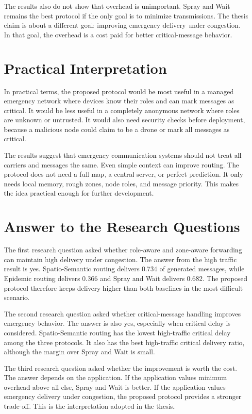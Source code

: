 The results also do not show that overhead is unimportant. Spray and Wait remains the best protocol if the only goal is to minimize transmissions. The thesis claim is about a different goal: improving emergency delivery under congestion. In that goal, the overhead is a cost paid for better critical-message behavior.

\section{Practical Interpretation}
In practical terms, the proposed protocol would be most useful in a managed emergency network where devices know their roles and can mark messages as critical. It would be less useful in a completely anonymous network where roles are unknown or untrusted. It would also need security checks before deployment, because a malicious node could claim to be a drone or mark all messages as critical.

The results suggest that emergency communication systems should not treat all carriers and messages the same. Even simple context can improve routing. The protocol does not need a full map, a central server, or perfect prediction. It only needs local memory, rough zones, node roles, and message priority. This makes the idea practical enough for further development.

\section{Answer to the Research Questions}
The first research question asked whether role-aware and zone-aware forwarding can maintain high delivery under congestion. The answer from the high traffic result is yes. Spatio-Semantic routing delivers 0.734 of generated messages, while Epidemic routing delivers 0.366 and Spray and Wait delivers 0.682. The proposed protocol therefore keeps delivery higher than both baselines in the most difficult scenario.

The second research question asked whether critical-message handling improves emergency behavior. The answer is also yes, especially when critical delay is considered. Spatio-Semantic routing has the lowest high-traffic critical delay among the three protocols. It also has the best high-traffic critical delivery ratio, although the margin over Spray and Wait is small.

The third research question asked whether the improvement is worth the cost. The answer depends on the application. If the application values minimum overhead above all else, Spray and Wait is better. If the application values emergency delivery under congestion, the proposed protocol provides a stronger trade-off. This is the interpretation adopted in the thesis.

